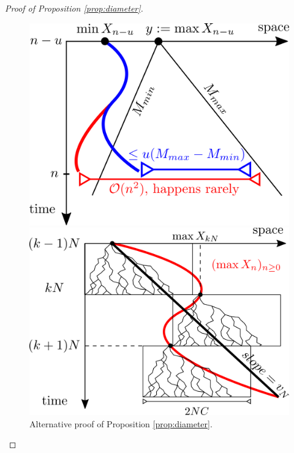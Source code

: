 \begin{proof}[Proof of Proposition \ref{prop:diameter}]
\begin{figure}[!h]
\centering
\begin{minipage}{0.45\textwidth}
  \centering
  \includegraphics[width=\linewidth]{graphics/g2}
  \caption{Proof of Proposition \ref{prop:diameter}. }
  \label{fig:diam_proof}
\end{minipage}\hfill%
\begin{minipage}{0.45\textwidth}
  \centering
  \includegraphics[width=\linewidth]{graphics/g1}
  \caption{Alternative proof of Proposition \ref{prop:diameter}. }
  \label{fig:diam_alternative_proof}
\end{minipage}
\end{figure}


\end{proof}
